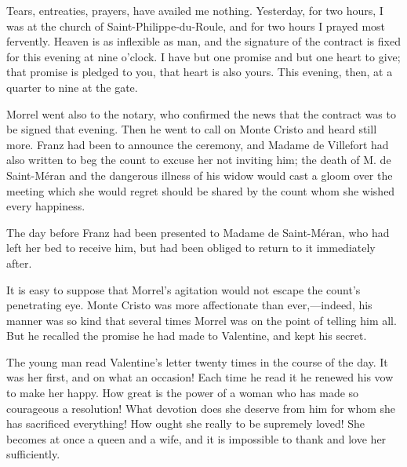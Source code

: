 \begin{mail}{}{}
Tears, entreaties, prayers, have availed me nothing. Yesterday, for two hours, I was at the church of Saint-Philippe-du-Roule, and for two hours I prayed most fervently. Heaven is as inflexible as man, and the signature of the contract is fixed for this evening at nine o'clock. I have but one promise and but one heart to give; that promise is pledged to you, that heart is also yours. This evening, then, at a quarter to nine at the gate. 



\end{mail}

 Morrel went also to the notary, who confirmed the news that the contract was to be signed that evening. Then he went to call on Monte Cristo and heard still more. Franz had been to announce the ceremony, and Madame de Villefort had also written to beg the count to excuse her not inviting him; the death of M. de Saint-Méran and the dangerous illness of his widow would cast a gloom over the meeting which she would regret should be shared by the count whom she wished every happiness. 

 The day before Franz had been presented to Madame de Saint-Méran, who had left her bed to receive him, but had been obliged to return to it immediately after. 

 It is easy to suppose that Morrel's agitation would not escape the count's penetrating eye. Monte Cristo was more affectionate than ever,—indeed, his manner was so kind that several times Morrel was on the point of telling him all. But he recalled the promise he had made to Valentine, and kept his secret. 

 The young man read Valentine's letter twenty times in the course of the day. It was her first, and on what an occasion! Each time he read it he renewed his vow to make her happy. How great is the power of a woman who has made so courageous a resolution! What devotion does she deserve from him for whom she has sacrificed everything! How ought she really to be supremely loved! She becomes at once a queen and a wife, and it is impossible to thank and love her sufficiently. 

